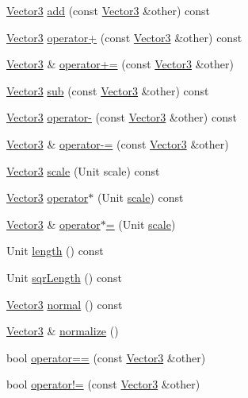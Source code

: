 \begin{DoxyCompactItemize}
\item 
\hyperlink{class_race_tray_1_1_vector3}{Vector3} \hyperlink{group___math_gaf130562c28e9acf79a1947eae9bc583b}{add} (const \hyperlink{class_race_tray_1_1_vector3}{Vector3} \&other) const 
\item 
\hyperlink{class_race_tray_1_1_vector3}{Vector3} \hyperlink{group___math_ga66fc04cc87dd36820cc8cad9d3ba7fae}{operator+} (const \hyperlink{class_race_tray_1_1_vector3}{Vector3} \&other) const 
\item 
\hyperlink{class_race_tray_1_1_vector3}{Vector3} \& \hyperlink{group___math_ga5ccb50254f27230d20aab11372215fbc}{operator+=} (const \hyperlink{class_race_tray_1_1_vector3}{Vector3} \&other)
\item 
\hyperlink{class_race_tray_1_1_vector3}{Vector3} \hyperlink{group___math_ga76645af9d0562c9964fcd0850a327288}{sub} (const \hyperlink{class_race_tray_1_1_vector3}{Vector3} \&other) const 
\item 
\hyperlink{class_race_tray_1_1_vector3}{Vector3} \hyperlink{group___math_gaa69c327bce74c6fccc67732aa72d51e4}{operator-\/} (const \hyperlink{class_race_tray_1_1_vector3}{Vector3} \&other) const 
\item 
\hyperlink{class_race_tray_1_1_vector3}{Vector3} \& \hyperlink{group___math_gae0287f848b8e46e8e2abbaa1a8940f9d}{operator-\/=} (const \hyperlink{class_race_tray_1_1_vector3}{Vector3} \&other)
\item 
\hyperlink{class_race_tray_1_1_vector3}{Vector3} \hyperlink{group___math_ga9282288d74a882eb1b049abc21f8b0c7}{scale} (Unit scale) const 
\item 
\hyperlink{class_race_tray_1_1_vector3}{Vector3} \hyperlink{group___math_ga89a8462c9f9c3802cbc7092f234e9a04}{operator$\ast$} (Unit \hyperlink{group___math_ga9282288d74a882eb1b049abc21f8b0c7}{scale}) const 
\item 
\hyperlink{class_race_tray_1_1_vector3}{Vector3} \& \hyperlink{group___math_gaf2ead3fae3ec911d2d0ece2c88f0488c}{operator$\ast$=} (Unit \hyperlink{group___math_ga9282288d74a882eb1b049abc21f8b0c7}{scale})
\item 
Unit \hyperlink{group___math_ga060ae22a7ea4202c7d401bbcb0c0732d}{length} () const 
\item 
Unit \hyperlink{group___math_ga0642d7d561ce609f96b1df8ad6c8bb8a}{sqr\-Length} () const 
\item 
\hyperlink{class_race_tray_1_1_vector3}{Vector3} \hyperlink{group___math_ga822111c5601c2d6b8dab069acd2df835}{normal} () const 
\item 
\hyperlink{class_race_tray_1_1_vector3}{Vector3} \& \hyperlink{group___math_ga606bb7deceeda5a9cab17e22e1aed668}{normalize} ()
\item 
bool \hyperlink{group___math_gacc0738d9f3ef7de9deb35b27472e6397}{operator==} (const \hyperlink{class_race_tray_1_1_vector3}{Vector3} \&other)
\item 
bool \hyperlink{group___math_ga618208f396f28328642826f06fcab560}{operator!=} (const \hyperlink{class_race_tray_1_1_vector3}{Vector3} \&other)
\end{DoxyCompactItemize}


